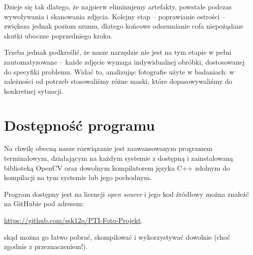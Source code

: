 \documentclass[]{mwart}
\begin{document}
Dzieje się tak dlatego, że najpierw eliminujemy artefakty,
powstałe podczas wywoływania i skanowania zdjęcia.
Kolejny etap -- poprawianie ostrości -- zwiększa jednak poziom szumu,
dlatego końcowe odszumianie cofa niepożądane skutki uboczne poprzedniego kroku.

Trzeba jednak podkreślić, że nasze narzędzie nie jest na tym etapie w pełni zautomatyzowane
-- każde zdjęcie wymaga indywidualnej obróbki, dostosowanej do specyfiki problemu.
Widać to, analizując fotografie użyte w badaniach: w zależności od potrzeb stosowaliśmy różne maski,
które dopasowywaliśmy do konkretnej sytuacji.




\section{Dostępność programu}
Na chwilę obecną nasze rozwiązanie jest zaawansowanym programem terminalowym,
działającym na każdym systemie z dostępną i zainstalowaną biblioteką OpenCV oraz
dowolnym kompilatorem języka C++ zdolnym do kompilacji na tym systemie lub jego pochodnym.

Program dostępny jest na licencji \textit{open source} i jego kod źródłowy można znaleźć na GitHubie
pod adresem:
\begin{center}
    \url{https://github.com/ssk12o/PTI-Foto-Projekt}.
\end{center}
skąd można go łatwo pobrać, skompilować i wykorzystywać dowolnie (choć zgodnie z przeznaczeniem!).




\newpage
\end{document}
